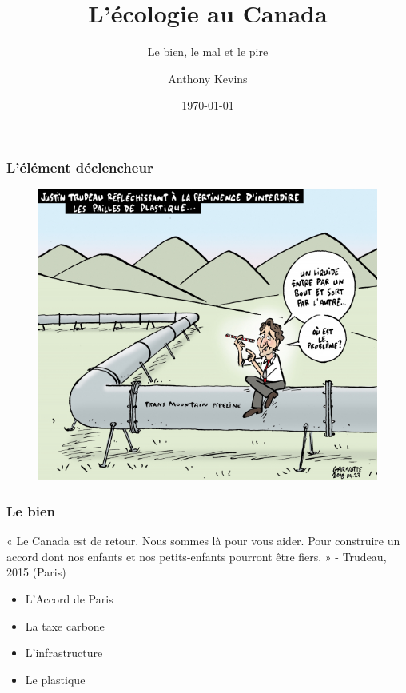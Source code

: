 \documentclass[14pt]{beamer}
\title{L'écologie au Canada}
\subtitle{Le bien, le mal et le pire}
\author{Anthony Kevins}
\date{\today}
\begin{document}
\begin{frame}
\titlepage
\end{frame}

\begin{frame}
	\frametitle{L'élément déclencheur}
	\begin{figure}
		\includegraphics[scale=.575]{trans_mountain}
	\end{figure}
\end{frame}

\begin{frame}
\frametitle{Le bien}
« Le Canada est de retour. Nous sommes là pour vous aider. Pour construire un accord dont nos enfants et nos petits-enfants pourront être fiers. » - Trudeau, 2015 (Paris)

\bigskip

\begin{itemize}
	\pause
	\item L'Accord de Paris %
	\pause
	\item La taxe carbone %
	\pause
	\item L'infrastructure %
	\pause
	\item Le plastique %
\end{itemize}

\end{frame}
\end{document}
